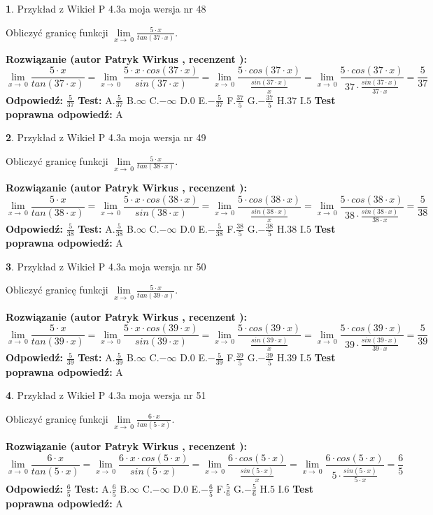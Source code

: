 \documentclass[12pt, a4paper]{article}
\theoremstyle{definition} %
\newtheorem{zad}{}
\newcommand{\zadStart}[1]{\begin{zad}#1\newline}
\newcommand{\zadStop}{\end{zad}}
\newcommand{\rozwStart}[2]{\noindent \textbf{Rozwiązanie (autor #1 , recenzent #2): }\newline}
\newcommand{\rozwStop}{\newline}
\newcommand{\odpStart}{\noindent \textbf{Odpowiedź:}\newline}
\newcommand{\odpStop}{\newline}
\newcommand{\testStart}{\noindent \textbf{Test:}\newline}
\newcommand{\testStop}{\newline}
\newcommand{\kluczStart}{\noindent \textbf{Test poprawna odpowiedź:}\newline}
\newcommand{\kluczStop}{\newline}
\begin{document}
\zadStart{Przykład z Wikieł P 4.3a moja wersja nr 48}


Obliczyć granicę funkcji $\lim\limits_{x\to\ 0}\frac{5 \cdot x}{tan(37 \cdot x)}$.
\zadStop
\rozwStart{Patryk Wirkus}{}
$$\lim\limits_{x\to\ 0}\frac{5 \cdot x}{tan(37 \cdot x)}=\lim\limits_{x\to\ 0}\frac{5 \cdot x \cdot cos(37 \cdot x)}{sin(37 \cdot x)}=\lim\limits_{x\to\ 0}\frac{5 \cdot cos(37 \cdot x)}{\frac{sin(37 \cdot x)}{x}}=\lim\limits_{x\to\ 0}\frac{5 \cdot cos(37 \cdot x)}{37 \cdot \frac{sin(37 \cdot x)}{37 \cdot x}} = \frac{5}{37}$$
\rozwStop
\odpStart
$\frac{5}{37}$
\odpStop
\testStart
A.$\frac{5}{37}$
B.$\infty$
C.$-\infty$
D.$0$
E.$-\frac{5}{37}$
F.$\frac{37}{5}$
G.$-\frac{37}{5}$
H.$37$
I.$5$
\testStop
\kluczStart
A
\kluczStop



\zadStart{Przykład z Wikieł P 4.3a moja wersja nr 49}


Obliczyć granicę funkcji $\lim\limits_{x\to\ 0}\frac{5 \cdot x}{tan(38 \cdot x)}$.
\zadStop
\rozwStart{Patryk Wirkus}{}
$$\lim\limits_{x\to\ 0}\frac{5 \cdot x}{tan(38 \cdot x)}=\lim\limits_{x\to\ 0}\frac{5 \cdot x \cdot cos(38 \cdot x)}{sin(38 \cdot x)}=\lim\limits_{x\to\ 0}\frac{5 \cdot cos(38 \cdot x)}{\frac{sin(38 \cdot x)}{x}}=\lim\limits_{x\to\ 0}\frac{5 \cdot cos(38 \cdot x)}{38 \cdot \frac{sin(38 \cdot x)}{38 \cdot x}} = \frac{5}{38}$$
\rozwStop
\odpStart
$\frac{5}{38}$
\odpStop
\testStart
A.$\frac{5}{38}$
B.$\infty$
C.$-\infty$
D.$0$
E.$-\frac{5}{38}$
F.$\frac{38}{5}$
G.$-\frac{38}{5}$
H.$38$
I.$5$
\testStop
\kluczStart
A
\kluczStop



\zadStart{Przykład z Wikieł P 4.3a moja wersja nr 50}


Obliczyć granicę funkcji $\lim\limits_{x\to\ 0}\frac{5 \cdot x}{tan(39 \cdot x)}$.
\zadStop
\rozwStart{Patryk Wirkus}{}
$$\lim\limits_{x\to\ 0}\frac{5 \cdot x}{tan(39 \cdot x)}=\lim\limits_{x\to\ 0}\frac{5 \cdot x \cdot cos(39 \cdot x)}{sin(39 \cdot x)}=\lim\limits_{x\to\ 0}\frac{5 \cdot cos(39 \cdot x)}{\frac{sin(39 \cdot x)}{x}}=\lim\limits_{x\to\ 0}\frac{5 \cdot cos(39 \cdot x)}{39 \cdot \frac{sin(39 \cdot x)}{39 \cdot x}} = \frac{5}{39}$$
\rozwStop
\odpStart
$\frac{5}{39}$
\odpStop
\testStart
A.$\frac{5}{39}$
B.$\infty$
C.$-\infty$
D.$0$
E.$-\frac{5}{39}$
F.$\frac{39}{5}$
G.$-\frac{39}{5}$
H.$39$
I.$5$
\testStop
\kluczStart
A
\kluczStop



\zadStart{Przykład z Wikieł P 4.3a moja wersja nr 51}


Obliczyć granicę funkcji $\lim\limits_{x\to\ 0}\frac{6 \cdot x}{tan(5 \cdot x)}$.
\zadStop
\rozwStart{Patryk Wirkus}{}
$$\lim\limits_{x\to\ 0}\frac{6 \cdot x}{tan(5 \cdot x)}=\lim\limits_{x\to\ 0}\frac{6 \cdot x \cdot cos(5 \cdot x)}{sin(5 \cdot x)}=\lim\limits_{x\to\ 0}\frac{6 \cdot cos(5 \cdot x)}{\frac{sin(5 \cdot x)}{x}}=\lim\limits_{x\to\ 0}\frac{6 \cdot cos(5 \cdot x)}{5 \cdot \frac{sin(5 \cdot x)}{5 \cdot x}} = \frac{6}{5}$$
\rozwStop
\odpStart
$\frac{6}{5}$
\odpStop
\testStart
A.$\frac{6}{5}$
B.$\infty$
C.$-\infty$
D.$0$
E.$-\frac{6}{5}$
F.$\frac{5}{6}$
G.$-\frac{5}{6}$
H.$5$
I.$6$
\testStop
\kluczStart
A
\kluczStop
\end{document}
